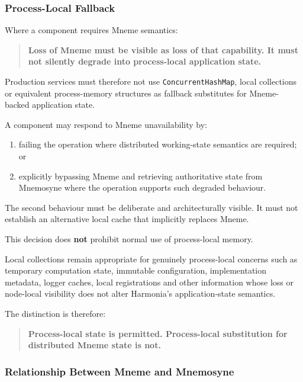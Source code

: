 \subsubsection{Process-Local Fallback}

Where a component requires Mneme semantics:

\begin{quote}
    \textbf{Loss of Mneme must be visible as loss of that capability. It must not silently degrade into process-local application state.}
\end{quote}

Production services must therefore not use \texttt{ConcurrentHashMap}, local collections or equivalent process-memory structures as fallback substitutes for Mneme-backed application state.

A component may respond to Mneme unavailability by:
\begin{enumerate}
    \item failing the operation where distributed working-state semantics are required; or
    \item explicitly bypassing Mneme and retrieving authoritative state from Mnemosyne where the operation supports such degraded behaviour.
\end{enumerate}

The second behaviour must be deliberate and architecturally visible. It must not establish an alternative local cache that implicitly replaces Mneme.

This decision does \textbf{not} prohibit normal use of process-local memory.

Local collections remain appropriate for genuinely process-local concerns such as temporary computation state, immutable configuration, implementation metadata, logger caches, local registrations and other information whose loss or node-local visibility does not alter Harmonia's application-state semantics.

The distinction is therefore:

\begin{quote}
    \textbf{Process-local state is permitted. Process-local substitution for distributed Mneme state is not.}
\end{quote}

\subsubsection{Relationship Between Mneme and Mnemosyne}

